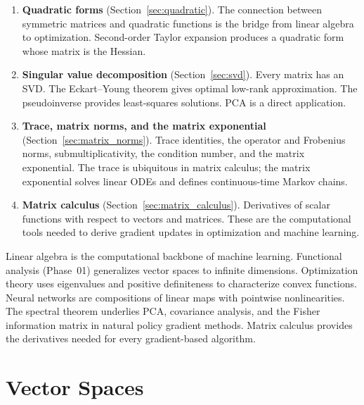 \documentclass[11pt,a4paper]{article}
\theoremstyle{definition}
\theoremstyle{plain}
\theoremstyle{remark}
\begin{document}
\begin{enumerate}[nosep]
    \item \textbf{Quadratic forms} (Section~\ref{sec:quadratic}). The connection
    between symmetric matrices and quadratic functions is the bridge from linear
    algebra to optimization. Second-order Taylor expansion produces a quadratic
    form whose matrix is the Hessian.

    \item \textbf{Singular value decomposition} (Section~\ref{sec:svd}). Every
    matrix has an SVD. The Eckart--Young theorem gives optimal low-rank
    approximation. The pseudoinverse provides least-squares solutions. PCA is
    a direct application.

    \item \textbf{Trace, matrix norms, and the matrix exponential}
    (Section~\ref{sec:matrix_norms}). Trace identities, the operator and Frobenius
    norms, submultiplicativity, the condition number, and the matrix exponential.
    The trace is ubiquitous in matrix calculus; the matrix exponential solves
    linear ODEs and defines continuous-time Markov chains.

    \item \textbf{Matrix calculus} (Section~\ref{sec:matrix_calculus}). Derivatives
    of scalar functions with respect to vectors and matrices. These are the
    computational tools needed to derive gradient updates in optimization and
    machine learning.
\end{enumerate}

\begin{rlconnection}
Linear algebra is the computational backbone of machine learning. Functional
analysis (Phase~01) generalizes vector spaces to infinite dimensions. Optimization
theory uses eigenvalues and positive definiteness to characterize convex functions.
Neural networks are compositions of linear maps with pointwise nonlinearities.
The spectral theorem underlies PCA, covariance analysis, and the Fisher information
matrix in natural policy gradient methods. Matrix calculus provides the derivatives
needed for every gradient-based algorithm.
\end{rlconnection}

\section{Vector Spaces}
\label{sec:vector_spaces}
\end{document}
